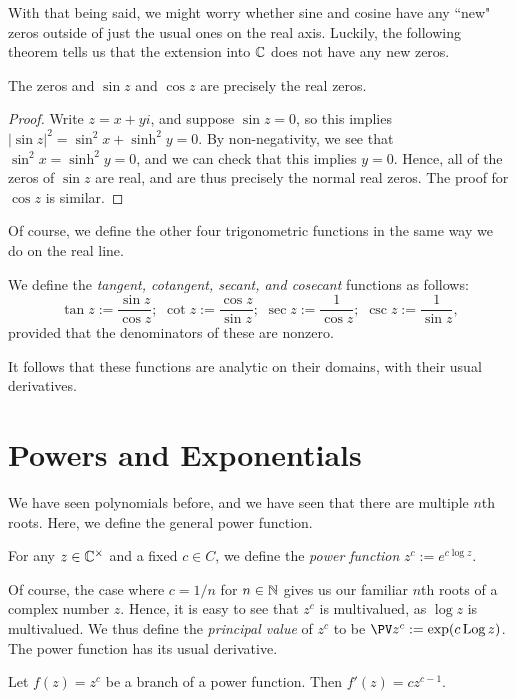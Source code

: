 \documentclass{article}
\begin{document}
With that being said, we might worry whether sine and cosine have any ``new" zeros outside of just the usual ones on the real axis. Luckily, the following theorem tells us that the extension into $\mathbb C$ does not have any new zeros.
\begin{theorem}
The zeros and $\sin z$ and $\cos z$ are precisely the real zeros.
\end{theorem}
\begin{proof}
Write $z=x+yi$, and suppose $\sin z = 0$, so this implies $|\sin z|^2 = \sin^2 x + \sinh^2 y = 0$. By non-negativity, we see that $\sin^2x  = \sinh^2 y = 0$, and we can check that this implies $y=0$. Hence, all of the zeros of $\sin z$ are real, and are thus precisely the normal real zeros. The proof for $\cos z$ is similar.
\end{proof}

Of course, we define the other four trigonometric functions in the same way we do on the real line.
\begin{definition}
We define the \textit{tangent, cotangent, secant, and cosecant} functions as follows:
$$\tan z := \frac{\sin z}{\cos z};\,\, \cot z := \frac{\cos z}{\sin z};\,\, \sec z := \frac 1{\cos z};\,\, \csc z := \frac 1{\sin z},$$
provided that the denominators of these are nonzero.
\end{definition}
It follows that these functions are analytic on their domains, with their usual derivatives.
\setcounter{section}{46}
\section{Powers and Exponentials}
We have seen polynomials before, and we have seen that there are multiple $n$th roots. Here, we define the general power function.
\begin{definition}
For any $z\in\mathbb C^\times$ and a fixed $c\in C$, we define the \textit{power function} $z^c := e^{c \log z}$.
\end{definition}
Of course, the case where $c = 1/n$ for $n\in\mathbb N$ gives us our familiar $n$th roots of a complex number $z$. Hence, it is easy to see that $z^c$ is multivalued, as $\log z$ is multivalued. We thus define the \textit{principal value} of $z^c$ to be $\PV z^c := \exp(c \Log z)$. The power function has its usual derivative.
\begin{proposition}
Let $f(z) = z^c$ be a branch of a power function. Then $f'(z) = cz^{c-1}$.
\end{proposition}
\end{document}

